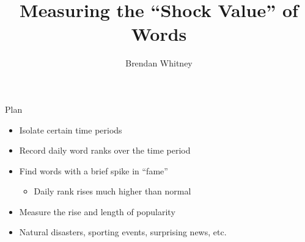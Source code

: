\documentclass{beamer}
\begin{document}
\title{Measuring the ``Shock Value'' of Words}
\author{Brendan Whitney}

\maketitle

\begin{frame}{Plan}
    \begin{itemize}
        \item Isolate certain time periods
        \item Record daily word ranks over the time period
        \item Find words with a brief spike in ``fame''
            \begin{itemize}
                \item Daily rank rises much higher than normal
            \end{itemize}
        \item Measure the rise and length of popularity
        \item Natural disasters, sporting events, surprising news, etc.
    \end{itemize}
\end{frame}
\end{document}
